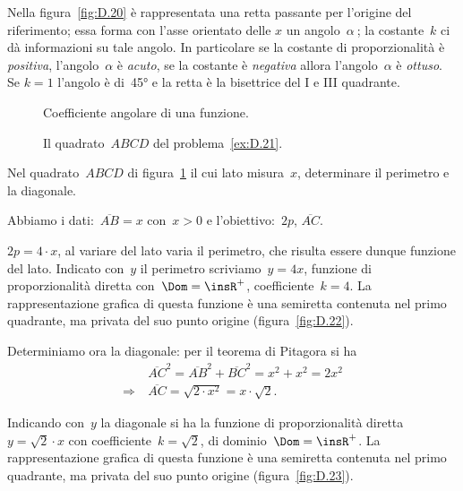Nella figura~\ref{fig:D.20} è rappresentata una retta passante per l'origine del riferimento; essa forma con l'asse orientato delle
$x$ un angolo~$\alpha~$; la costante~$k$ ci dà informazioni su tale angolo.
In particolare se la costante di proporzionalità è \emph{positiva}, l'angolo~$\alpha$ è \emph{acuto}, se la costante è
\emph{negativa} allora l'angolo~$\alpha$ è \emph{ottuso}. Se $k=1$ l'angolo è di~45° e la retta è la bisettrice del I e III quadrante.

\begin{figure}[b]
 \begin{minipage}[t]{.45\textwidth}
  \centering
  \caption{Coefficiente angolare di una funzione.}\label{fig:D.20}
 \end{minipage}\hfil
 \begin{minipage}[t]{.45\textwidth}
  \centering
  \caption{Il quadrato~$ABCD$ del problema~\ref{ex:D.21}.}\label{fig:D.21}
 \end{minipage}
\end{figure}


\begin{problema}
\label{ex:D.21}
Nel quadrato~$ABCD$ di figura~\ref{fig:D.21} il cui lato misura~$x$, determinare il perimetro e la diagonale.
\end{problema}
\begin{soluzione}
 Abbiamo i dati:~$\overline{AB}=x$ con~$x>0$ e l'obiettivo:~$2p$, $\overline{AC}$.

 $2p=4\cdot x$, al variare del lato varia il perimetro, che risulta essere dunque funzione del lato.
Indicato con~$y$ il perimetro scriviamo~$y=4x$, funzione di proporzionalità diretta con~$\Dom=\insR^{+}$,
coefficiente~$k=4$. La rappresentazione grafica di questa funzione è una semiretta contenuta nel primo quadrante,
ma privata del suo punto origine (figura~\ref{fig:D.22}).

Determiniamo ora la diagonale: per il teorema di Pitagora si ha
\begin{align*}
 &\overline{AC}^{2}=\overline{AB}^{2}+\overline{BC}^{2}=x^{2}+x^{2}=2x^{2}\\
 \Rightarrow\:&\overline{AC}=\sqrt{2\cdot x^{2}}=x\cdot \sqrt{2}.
\end{align*}

Indicando con~$y$ la diagonale si ha la funzione di proporzionalità diretta~$y=\sqrt{2}\cdot x$
con coefficiente~$k=\sqrt{2}$, di dominio~$\Dom=\insR^{+}$.
La rappresentazione grafica di questa funzione è una semiretta contenuta nel primo quadrante, ma privata del suo punto origine (figura~\ref{fig:D.23}).
\end{soluzione}

